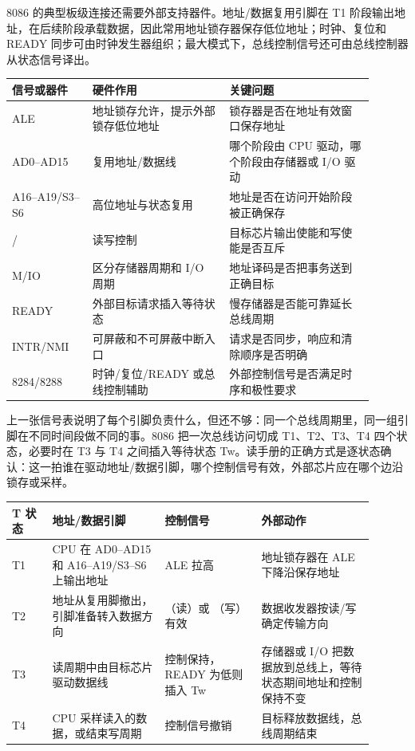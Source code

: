 8086 的典型板级连接还需要外部支持器件。地址/数据复用引脚在 T1 阶段输出地址，在后续阶段承载数据，因此常用地址锁存器保存低位地址；时钟、复位和 READY 同步可由时钟发生器组织；最大模式下，总线控制信号还可由总线控制器从状态信号译出。

\begin{longtable}{L{0.2\linewidth}L{0.34\linewidth}L{0.36\linewidth}}
\toprule
信号或器件 & 硬件作用 & 关键问题 \\
\midrule
ALE & 地址锁存允许，提示外部锁存低位地址 & 锁存器是否在地址有效窗口保存地址 \\
AD0--AD15 & 复用地址/数据线 & 哪个阶段由 CPU 驱动，哪个阶段由存储器或 I/O 驱动 \\
A16--A19/S3--S6 & 高位地址与状态复用 & 地址是否在访问开始阶段被正确保存 \\
/ & 读写控制 & 目标芯片输出使能和写使能是否互斥 \\
M/IO & 区分存储器周期和 I/O 周期 & 地址译码是否把事务送到正确目标 \\
READY & 外部目标请求插入等待状态 & 慢存储器是否能可靠延长总线周期 \\
INTR/NMI & 可屏蔽和不可屏蔽中断入口 & 请求是否同步，响应和清除顺序是否明确 \\
8284/8288 & 时钟/复位/READY 或总线控制辅助 & 外部控制信号是否满足时序和极性要求 \\
\bottomrule
\end{longtable}

上一张信号表说明了每个引脚负责什么，但还不够：同一个总线周期里，同一组引脚在不同时间段做不同的事。8086 把一次总线访问切成 T1、T2、T3、T4 四个状态，必要时在 T3 与 T4 之间插入等待状态 Tw。读手册的正确方式是逐状态确认：这一拍谁在驱动地址/数据引脚，哪个控制信号有效，外部芯片应在哪个边沿锁存或采样。

\begin{longtable}{L{0.1\linewidth}L{0.28\linewidth}L{0.24\linewidth}L{0.28\linewidth}}
\toprule
T 状态 & 地址/数据引脚 & 控制信号 & 外部动作 \\
\midrule
T1 & CPU 在 AD0--AD15 和 A16--A19/S3--S6 上输出地址 & ALE 拉高 & 地址锁存器在 ALE 下降沿保存地址 \\
T2 & 地址从复用脚撤出，引脚准备转入数据方向 & （读）或 （写）有效 & 数据收发器按读/写确定传输方向 \\
T3 & 读周期中由目标芯片驱动数据线 & 控制保持，READY 为低则插入 Tw & 存储器或 I/O 把数据放到总线上，等待状态期间地址和控制保持不变 \\
T4 & CPU 采样读入的数据，或结束写周期 & 控制信号撤销 & 目标释放数据线，总线周期结束 \\
\bottomrule
\end{longtable}

